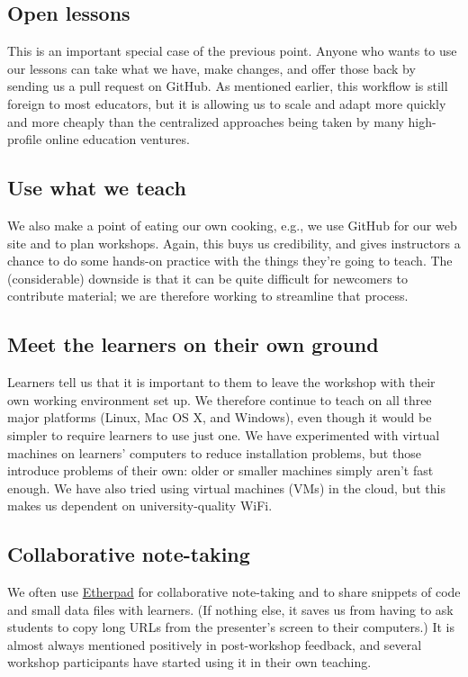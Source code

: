\documentclass[10pt,a4paper,twocolumn]{article}
\begin{document}
\subsection*{Open lessons}

This is an important special case of the previous point. Anyone who
wants to use our lessons can take what we have, make changes, and offer
those back by sending us a pull request on GitHub. As mentioned earlier,
this workflow is still foreign to most educators, but it is allowing us
to scale and adapt more quickly and more cheaply than the centralized
approaches being taken by many high-profile online education ventures.

\subsection*{Use what we teach}

We also make a point of eating our own cooking, e.g., we use GitHub for
our web site and to plan workshops. Again, this buys us credibility,
and gives instructors a chance to do some hands-on practice with the
things they're going to teach. The (considerable) downside is that it
can be quite difficult for newcomers to contribute material; we are
therefore working to streamline that process.

\subsection*{Meet the learners on their own ground}

Learners tell us that it is important to them to leave the workshop
with their own working environment set up. We therefore continue to
teach on all three major platforms (Linux, Mac OS X, and Windows),
even though it would be simpler to require learners to use just
one. We have experimented with virtual machines on learners' computers
to reduce installation problems, but those introduce problems of their
own: older or smaller machines simply aren't fast enough.  We have
also tried using virtual machines (VMs) in the cloud, but this makes
us dependent on university-quality WiFi.

\subsection*{Collaborative note-taking}

We often use \href{http://etherpad.org}{Etherpad} for collaborative
note-taking and to share snippets of code and small data files with
learners. (If nothing else, it saves us from having to ask students to
copy long URLs from the presenter's screen to their computers.) It is
almost always mentioned positively in post-workshop feedback, and
several workshop participants have started using it in their own
teaching.
\end{document}

